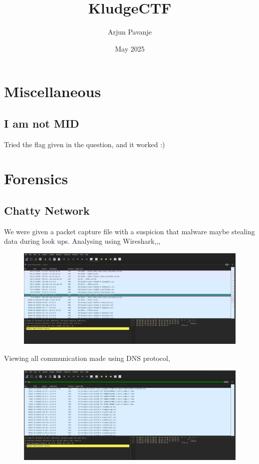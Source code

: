 \documentclass{article}
\title{KludgeCTF}
\author{Arjun Pavanje}
\date{May 2025}
\begin{document}
\maketitle
\section{Miscellaneous}
\subsection{I am not MID}
Tried the flag given in the question, and it worked :)
\section{Forensics}
\subsection{Chatty Network}
We were given a packet capture file with a suspicion that malware maybe stealing data during look ups.\newline
Analysing using Wireshark,,,
\begin{figure}[h!]
    \centering
    \includegraphics[width=1\linewidth]{figs/chatty_1.png}
    \label{fig:enter-label}
\end{figure}
\pagebreak
\newline Viewing all communication made using DNS protocol,
\begin{figure}[h!]
    \centering
    \includegraphics[width=1\linewidth]{figs/chattty_2.png}
    \label{fig:enter-label}
\end{figure}
\end{document}
